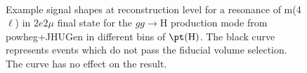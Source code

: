 \begin{figure}[htb]
\begin{center}
    \\
    \caption{ Example signal shapes at reconstruction level for a resonance of m(4$\ell$) in $2e2\mu$ final state for the $gg\rightarrow \mathrm{H}$ production mode from {\sc powheg+JHUGen} in different bins of $\pt(\mathrm{H})$. The black curve represents events which do not pass the fiducial volume selection. The curve has no effect on the result.
    }
  \label{fig:sigfits-pT4l-ggH-powheg15-JHUgen-125-maintext}
 \end{center}
\end{figure} \clearpage

